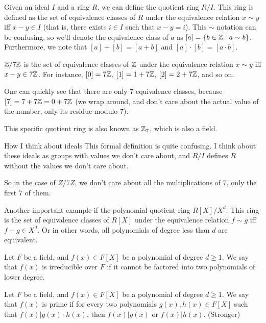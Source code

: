 Given an ideal $I$ and a ring $R$, we can define the quotient ring $R/I$.
This ring is defined as the set of equivalence classes of $R$ under the equivalence relation 
$x\sim y$ iff $x-y\in I$ (that is, there exists $i\in I$ such that $x-y=i$).
This $\sim$ notation can be confusing, so we'll denote the equivalence class of $a$ as $[a]=\{b\in \mathbb{Z} :a\sim b \}$.
Furthermore, we note that $[a]+[b]=[a+b]$ and $[a]\cdot[b]=[a\cdot b]$.

\begin{example}
    $\mathbb{Z}/7\mathbb{Z}$ is the set of equivalence classes of $\mathbb{Z}$ under the equivalence relation
    $x\sim y$ iff $x-y\in 7\mathbb{Z}$. 
    For instance, $[0]=7\mathbb{Z}$, $[1]=1+7\mathbb{Z}$, $[2]=2+7\mathbb{Z}$, and so on.

    One can quickly see that there are only 7 equivalence classes, because $[7]=7+7\mathbb{Z}=0+7\mathbb{Z}$ (we wrap around, 
    and don't care about the actual value of the number, only its residue modulo 7).

    This specific quotient ring is also known as $\mathbb{Z}_7$, which is also a field.
\end{example}


\begin{insight}{How I think about ideals}
    This formal definition is quite confusing. I think about these ideals as groups 
    with values we don't care about, and $R/I$ defines $R$ without 
    the values we don't care about.

    So in the case of $Z/7Z$, we don't care about 
    all the multiplications of $7$, only the first 7 of them.


    Another important example if the polynomial quotient ring $R[X]/X^d$. 
This ring is the set of equivalence classes of $R[X]$ under the equivalence relation
$f\sim g$ iff $f-g\in X^d$. Or in other words, all polynomials of degree less than $d$ are equivalent.
\end{insight}

\begin{definition}
    Let $F$ be a field, and $f(x)\in F[X]$ be a polynomial of degree $d\ge 1$.
    We say that $f(x)$ is irreducible over $F$ if it cannot be factored into 
    two polynomials of lower degree.
\end{definition}

\begin{definition}
    Let $F$ be a field, and $f(x)\in F[X]$ be a polynomial of degree $d\ge 1$.
    We say that $f(x)$ is prime if for every two polynomials $g(x),h(x)\in F[X]$
    such that $f(x)|g(x)\cdot h(x)$, then $f(x)|g(x)$ or $f(x)|h(x)$. (Stronger)
\end{definition}

